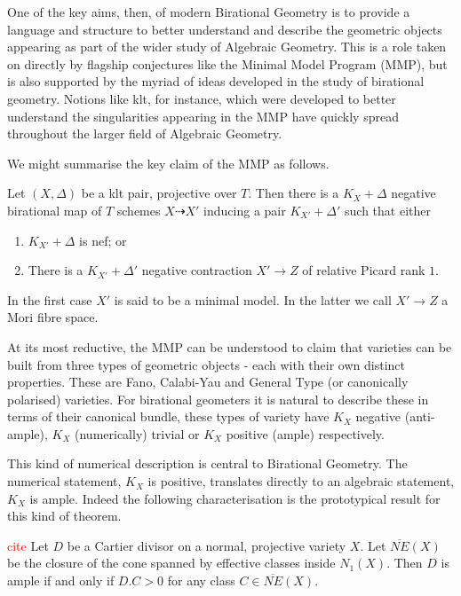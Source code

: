 \documentclass[a4paper,12pt]{book}
\newcommand\myworries[1]{\textcolor{red}{#1}}
\begin{document}
	One of the key aims, then, of modern Birational Geometry is to provide a language and structure to better understand and describe the geometric objects appearing as part of the wider study of Algebraic Geometry. This is a role taken on directly by flagship conjectures like the Minimal Model Program (MMP), but is also supported by the myriad of ideas developed in the study of birational geometry. Notions like klt, for instance, which were developed to better understand the singularities appearing in the MMP have quickly spread throughout the larger field of Algebraic Geometry.
	
	We might summarise the key claim of the MMP as follows.
	
	\begin{conjecture*}
		Let $(X,\Delta)$ be a klt pair, projective over $T$. Then there is a $K_{X}+\Delta$ negative birational map of $T$ schemes $X \dashrightarrow X'$ inducing a pair $K_{X'}+\Delta'$ such that either
		
		\begin{enumerate}
			\item $K_{X'}+\Delta$ is nef; or
			\item There is a $K_{X'}+\Delta'$ negative contraction $X' \to Z$ of relative Picard rank $1$.
		\end{enumerate}
	\end{conjecture*}

	In the first case $X'$ is said to be a minimal model. In the latter we call $X' \to Z$ a Mori fibre space.
	
	At its most reductive, the MMP can be understood to claim that varieties can be built from three types of geometric objects - each with their own distinct properties. These are Fano, Calabi-Yau and General Type (or canonically polarised) varieties. For birational geometers it is natural to describe these in terms of their canonical bundle, these types of variety have $K_{X}$ negative (anti-ample), $K_{X}$ (numerically) trivial or $K_{X}$ positive (ample) respectively.
	
	This kind of numerical description is central to Birational Geometry. The numerical statement, $K_{X}$ is positive, translates directly to an algebraic statement, $K_{X}$ is ample. Indeed the following characterisation is the prototypical result for this kind of theorem.
	
	\begin{theorem*}\myworries{cite}
		Let $D$ be a Cartier divisor on a normal, projective variety $X$. Let $\overline{NE}(X)$ be the closure of the cone spanned by effective classes inside $N_{1}(X)$. Then $D$ is ample if and only if $D.C >0$ for any class $C \in \overline{NE}(X)$.
	\end{theorem*}
		
\end{document}
